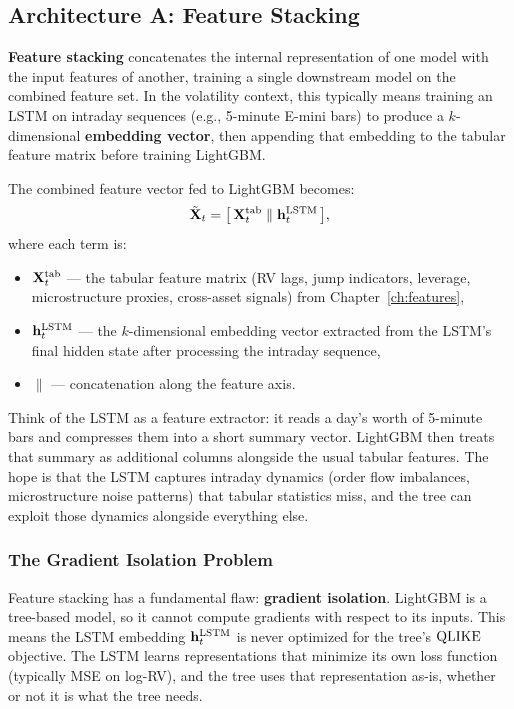 \subsection{Architecture A: Feature Stacking}\label{sec:hybrid:feat-stack}

\textbf{Feature stacking} concatenates the internal representation of one
model with the input features of another, training a single downstream
model on the combined feature set.  In the volatility context, this
typically means training an LSTM on intraday sequences (e.g., 5-minute
E-mini bars) to produce a $k$-dimensional \textbf{embedding vector},
then appending that embedding to the tabular feature matrix before
training LightGBM.

The combined feature vector fed to LightGBM becomes:
\begin{equation}\label{eq:feat-stack}
  \tilde{\mathbf{X}}_t = \bigl[\,\mathbf{X}_t^{\text{tab}} \;\|\;
    \mathbf{h}_t^{\text{LSTM}}\,\bigr],
\end{equation}
where each term is:
\begin{itemize}
  \item $\mathbf{X}_t^{\text{tab}}$ --- the tabular feature matrix (RV lags,
        jump indicators, leverage, microstructure proxies, cross-asset
        signals) from Chapter~\ref{ch:features},
  \item $\mathbf{h}_t^{\text{LSTM}}$ --- the $k$-dimensional embedding vector
        extracted from the LSTM's final hidden state after processing the
        intraday sequence,
  \item $\|$ --- concatenation along the feature axis.
\end{itemize}

\begin{intuition}
Think of the LSTM as a feature extractor: it reads a day's worth of
5-minute bars and compresses them into a short summary vector.
LightGBM then treats that summary as additional columns alongside the
usual tabular features.  The hope is that the LSTM captures intraday
dynamics (order flow imbalances, microstructure noise patterns) that
tabular statistics miss, and the tree can exploit those dynamics
alongside everything else.
\end{intuition}

\subsubsection{The Gradient Isolation Problem}

Feature stacking has a fundamental flaw: \textbf{gradient isolation}.
LightGBM is a tree-based model, so it cannot compute gradients with
respect to its inputs.  This means the LSTM embedding
$\mathbf{h}_t^{\text{LSTM}}$ is never optimized for the tree's $\operatorname{QLIKE}$
objective.  The LSTM learns representations that minimize its own loss
function (typically MSE on log-RV), and the tree uses that
representation as-is, whether or not it is what the tree needs.

